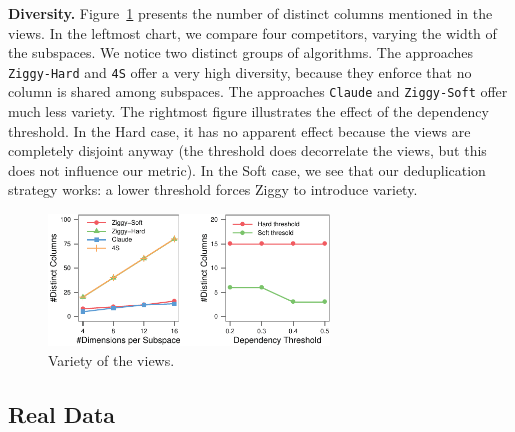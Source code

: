 \textbf{Diversity.} Figure~\ref{pic:synthvariety} presents the number of
distinct co\-lumns mentioned in the views. In the leftmost chart, we compare
four competitors, varying the width of the subspaces. We notice two distinct
groups of algorithms. The approaches \texttt{Ziggy-Hard} and \texttt{4S} offer
a very high diversity, because they enforce that no column is shared among
subspaces. The approaches \texttt{Claude} and \texttt{Ziggy-Soft} offer much
less variety. The rightmost figure illustrates the effect of the dependency
threshold. In the Hard case, it has no appa\-rent effect because the views are
completely disjoint anyway (the threshold does decorrelate the views, but this
does not influence our metric). In the Soft case, we see that our deduplication
strategy works: a lower threshold forces Ziggy to introduce variety.

\begin{figure}[t!]
  \centering
  \includegraphics[height=3.5cm]{Plots/Synth-Dedup}
  \caption{Variety of the views.}
  \label{pic:synthvariety}
\end{figure}

\subsection{Real Data}
\label{sec:realdata}

